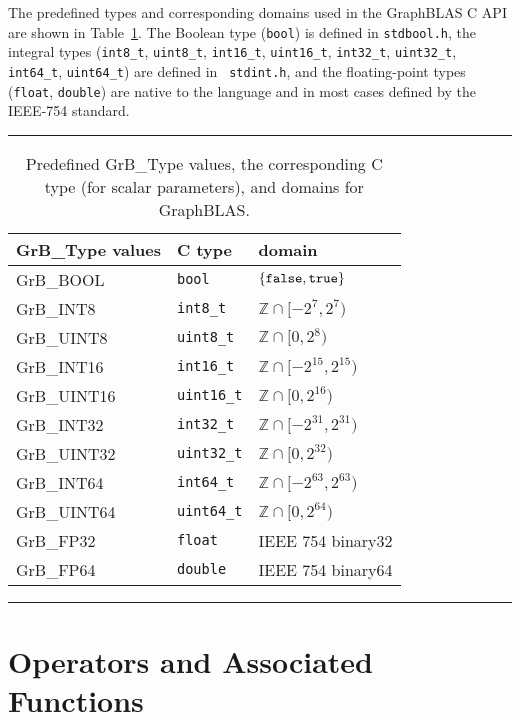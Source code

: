 The predefined types and corresponding domains used in the GraphBLAS C API are
shown in Table~\ref{Tab:PredefinedTypes}.  The Boolean type ({\tt bool})
is defined in {\tt stdbool.h}, the integral types ({\tt int8\_t},
{\tt uint8\_t}, {\tt int16\_t}, {\tt uint16\_t}, {\tt int32\_t},
{\tt uint32\_t}, {\tt int64\_t}, {\tt uint64\_t}) are defined in {\tt
stdint.h}, and the floating-point types ({\tt float}, {\tt double}) are
native to the language and in most cases defined by the IEEE-754 standard.

\begin{table}
\hrule
\begin{center}
\caption{Predefined {\sf GrB\_Type} values, the corresponding C type (for scalar
parameters), and domains for GraphBLAS.}
\label{Tab:PredefinedTypes}
\begin{tabular}{l|l|l}
{\sf GrB\_Type values} & C type            & domain \\
\hline
{\sf GrB\_BOOL}        & {\tt bool}        & $\{ {\tt false}, {\tt true} \}$  \\
{\sf GrB\_INT8}        & {\tt int8\_t}     & $\mathbb{Z} \cap [-2^{7},2^{7})$  \\
{\sf GrB\_UINT8}       & {\tt uint8\_t}    & $\mathbb{Z} \cap [0,2{^8})$  \\
{\sf GrB\_INT16}       & {\tt int16\_t}    & $\mathbb{Z} \cap [-2^{15},2^{15})$ \\
{\sf GrB\_UINT16}      & {\tt uint16\_t}   & $\mathbb{Z} \cap [0,2^{16})$ \\
{\sf GrB\_INT32}       & {\tt int32\_t}    & $\mathbb{Z} \cap [-2^{31},2^{31})$ \\
{\sf GrB\_UINT32}      & {\tt uint32\_t}   & $\mathbb{Z} \cap [0,2^{32})$ \\
{\sf GrB\_INT64}       & {\tt int64\_t}    & $\mathbb{Z} \cap [-2^{63},2^{63})$ \\
{\sf GrB\_UINT64}      & {\tt uint64\_t}   & $\mathbb{Z} \cap [0,2^{64})$ \\
{\sf GrB\_FP32}        & {\tt float}       & IEEE 754 {\sf binary32}  \\
{\sf GrB\_FP64}        & {\tt double}      & IEEE 754 {\sf binary64}  \\
\end{tabular}
\end{center}
\hrule
\end{table}

\section{Operators and Associated Functions}


